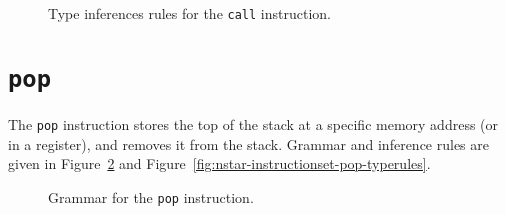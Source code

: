\begin{figure}[H]
  \centering

  \begin{prooftree}
  \end{prooftree}

  \caption{Type inferences rules for the \texttt{call} instruction.}
  \label{fig:nstar-instructionset-call-typerules}
\end{figure}

\section{\texttt{pop}}\label{sec:nstar-instructionset-pop}

The \texttt{pop} instruction stores the top of the stack at a specific memory address (or in a register), and removes it from the stack.
Grammar and inference rules are given in Figure~\ref{fig:nstar-instructionset-pop-grammar} and Figure~\ref{fig:nstar-instructionset-pop-typerules}.

\begin{figure}[H]
  \centering


  \caption{Grammar for the \texttt{pop} instruction.}
  \label{fig:nstar-instructionset-pop-grammar}
\end{figure}

